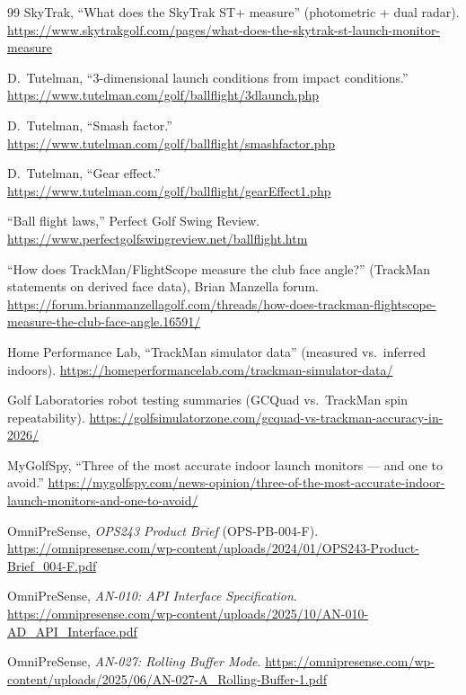 \begin{thebibliography}{99}
SkyTrak, ``What does the SkyTrak ST+ measure'' (photometric + dual
radar).
\url{https://www.skytrakgolf.com/pages/what-does-the-skytrak-st-launch-monitor-measure}


D.~Tutelman, ``3-dimensional launch conditions from impact conditions.''
\url{https://www.tutelman.com/golf/ballflight/3dlaunch.php}

D.~Tutelman, ``Smash factor.''
\url{https://www.tutelman.com/golf/ballflight/smashfactor.php}

D.~Tutelman, ``Gear effect.''
\url{https://www.tutelman.com/golf/ballflight/gearEffect1.php}

``Ball flight laws,'' Perfect Golf Swing Review.
\url{https://www.perfectgolfswingreview.net/ballflight.htm}

``How does TrackMan/FlightScope measure the club face angle?'' (TrackMan
statements on derived face data), Brian Manzella forum.
\url{https://forum.brianmanzellagolf.com/threads/how-does-trackman-flightscope-measure-the-club-face-angle.16591/}

Home Performance Lab, ``TrackMan simulator data'' (measured vs.\ inferred
indoors). \url{https://homeperformancelab.com/trackman-simulator-data/}

Golf Laboratories robot testing summaries (GCQuad vs.\ TrackMan spin
repeatability).
\url{https://golfsimulatorzone.com/gcquad-vs-trackman-accuracy-in-2026/}

MyGolfSpy, ``Three of the most accurate indoor launch monitors --- and
one to avoid.''
\url{https://mygolfspy.com/news-opinion/three-of-the-most-accurate-indoor-launch-monitors-and-one-to-avoid/}

OmniPreSense, \emph{OPS243 Product Brief} (OPS-PB-004-F).
\url{https://omnipresense.com/wp-content/uploads/2024/01/OPS243-Product-Brief_004-F.pdf}

OmniPreSense, \emph{AN-010: API Interface Specification}.
\url{https://omnipresense.com/wp-content/uploads/2025/10/AN-010-AD_API_Interface.pdf}

OmniPreSense, \emph{AN-027: Rolling Buffer Mode}.
\url{https://omnipresense.com/wp-content/uploads/2025/06/AN-027-A_Rolling-Buffer-1.pdf}


\end{thebibliography}
